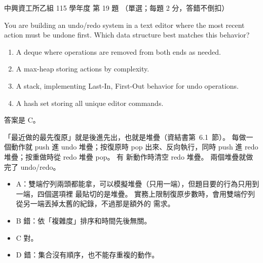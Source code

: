 \begin{pastexam}[label={px:nchu-115-is-19}]{中興資工所乙組 115 學年度 第 19 題}
（單選；每題 2 分，答錯不倒扣）

You are building an undo/redo system in a text editor where the most recent action must be
undone first. Which data structure best matches this behavior?
\begin{enumerate}[label=\Alph*.,nosep]
\item A deque where operations are removed from both ends as needed.
\item A max-heap storing actions by complexity.
\item A stack, implementing Last-In, First-Out behavior for undo operations.
\item A hash set storing all unique editor commands.
\end{enumerate}
\end{pastexam}

\begin{pastsoln}
答案是 C。

「最近做的最先復原」就是後進先出，也就是堆疊（資結書第~6.1~節）。 每做一個動作就 push 進
undo 堆疊；按復原時 pop 出來、反向執行，同時 push 進 redo 堆疊；按重做時從 redo 堆疊 pop。 有
新動作時清空 redo 堆疊。 兩個堆疊就做完了 undo/redo。
\begin{itemize}
\item A：雙端佇列兩頭都能拿，可以模擬堆疊（只用一端），但題目要的行為只用到一端，四個選項裡
最貼切的是堆疊。 實務上限制復原步數時，會用雙端佇列從另一端丟掉太舊的紀錄，不過那是額外的
需求。
\item B 錯：依「複雜度」排序和時間先後無關。
\item C 對。
\item D 錯：集合沒有順序，也不能存重複的動作。
\end{itemize}
\end{pastsoln}
